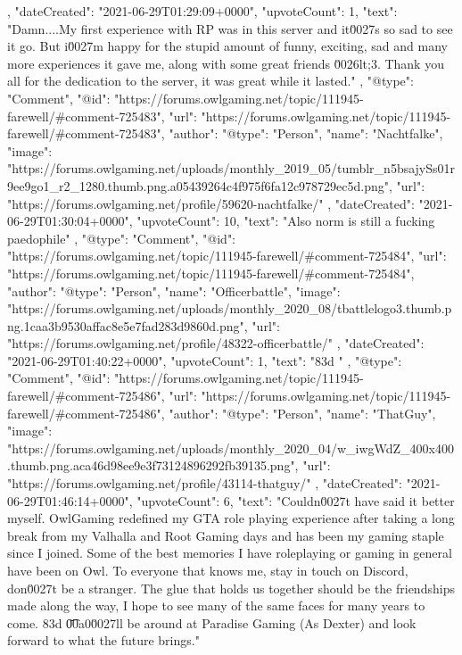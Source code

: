 {{{            },
            "dateCreated": "2021-06-29T01:29:09+0000",
            "upvoteCount": 1,
            "text": "Damn....My first experience with RP was in this server and it\u0027s so sad to see it go. But i\u0027m happy for the stupid amount of funny, exciting, sad and many more experiences it gave me, along with some great friends \u0026lt;3. Thank you all for the dedication to the server, it was great while it lasted.\n \n"
        },
        {
            "@type": "Comment",
            "@id": "https://forums.owlgaming.net/topic/111945-farewell/#comment-725483",
            "url": "https://forums.owlgaming.net/topic/111945-farewell/#comment-725483",
            "author": {
                "@type": "Person",
                "name": "Nachtfalke",
                "image": "https://forums.owlgaming.net/uploads/monthly_2019_05/tumblr_n5bsajySs01r9ee9go1_r2_1280.thumb.png.a05439264c4f975f6fa12c978729ec5d.png",
                "url": "https://forums.owlgaming.net/profile/59620-nachtfalke/"
            },
            "dateCreated": "2021-06-29T01:30:04+0000",
            "upvoteCount": 10,
            "text": "Also norm is still a fucking paedophile\n \n"
        },
        {
            "@type": "Comment",
            "@id": "https://forums.owlgaming.net/topic/111945-farewell/#comment-725484",
            "url": "https://forums.owlgaming.net/topic/111945-farewell/#comment-725484",
            "author": {
                "@type": "Person",
                "name": "Officerbattle",
                "image": "https://forums.owlgaming.net/uploads/monthly_2020_08/tbattlelogo3.thumb.png.1caa3b9530affac8e5e7fad283d9860d.png",
                "url": "https://forums.owlgaming.net/profile/48322-officerbattle/"
            },
            "dateCreated": "2021-06-29T01:40:22+0000",
            "upvoteCount": 1,
            "text": "\ud83d \n"
        },
        {
            "@type": "Comment",
            "@id": "https://forums.owlgaming.net/topic/111945-farewell/#comment-725486",
            "url": "https://forums.owlgaming.net/topic/111945-farewell/#comment-725486",
            "author": {
                "@type": "Person",
                "name": "ThatGuy",
                "image": "https://forums.owlgaming.net/uploads/monthly_2020_04/w_iwgWdZ_400x400.thumb.png.aca46d98ee9e3f73124896292fb39135.png",
                "url": "https://forums.owlgaming.net/profile/43114-thatguy/"
            },
            "dateCreated": "2021-06-29T01:46:14+0000",
            "upvoteCount": 6,
            "text": "Couldn\u0027t have said it better myself. OwlGaming redefined my GTA role playing experience after taking a long break from my Valhalla and Root Gaming days and has been my gaming staple since I joined. Some of the best memories I have roleplaying or gaming in general have been on Owl. To everyone that knows me, stay in touch on Discord, don\u0027t be a stranger. The glue that holds us together should be the friendships made along the way, I hope to see many of the same faces for many years to come. \ud83d \n\n\n\t\u00a0\n \n\n\n\tI\u0027ll be around at Paradise Gaming (As Dexter) and look forward to what the future brings.\n \n"
}}
